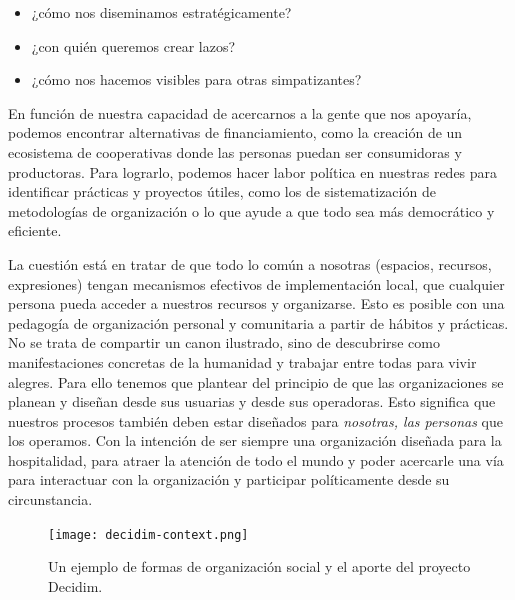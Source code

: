 \begin{itemize}
	\item ¿cómo nos diseminamos estratégicamente?
	\item ¿con quién queremos crear lazos?
	\item ¿cómo nos hacemos visibles para otras simpatizantes?
\end{itemize}

En función de nuestra capacidad de acercarnos a la gente que nos apoyaría, podemos encontrar alternativas de financiamiento, como la creación de un ecosistema de cooperativas donde las personas puedan ser consumidoras y productoras. Para lograrlo, podemos hacer labor política en nuestras redes para identificar prácticas y proyectos útiles, como los de sistematización de metodologías de organización o lo que ayude a que todo sea más democrático y eficiente.

La cuestión está en tratar de que todo lo común a nosotras (espacios, recursos, expresiones) tengan mecanismos efectivos de implementación local, que cualquier persona pueda acceder a nuestros recursos y organizarse. Esto es posible con una pedagogía de organización personal y comunitaria a partir de hábitos y prácticas. No se trata de compartir un canon ilustrado, sino de descubrirse como manifestaciones concretas de la humanidad y trabajar entre todas para vivir alegres. Para ello tenemos que plantear del principio de que las organizaciones se planean y diseñan desde sus usuarias y desde sus operadoras. Esto significa que nuestros procesos también deben estar diseñados para \emph{nosotras, las personas} que los operamos. Con la intención de ser siempre una organización diseñada para la hospitalidad, para atraer la atención de todo el mundo y poder acercarle una vía para interactuar con la organización y participar políticamente desde su circunstancia.

\begin{figure}[htbp]
	\centering
	\texttt{[image: decidim-context.png]}
	\caption[Proyecto Decidim.]{Un ejemplo de formas de organización social y el aporte del proyecto Decidim.}
	\label{fig:decidim}
\end{figure}

